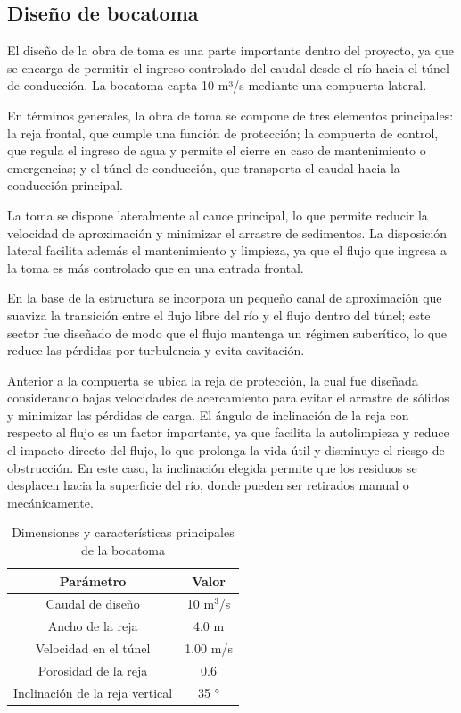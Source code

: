 \documentclass{article} %
\begin{document}
\subsection{Diseño de bocatoma}

El diseño de la obra de toma es una parte importante dentro del proyecto, ya que se encarga de permitir el ingreso controlado del caudal desde el río hacia el túnel de conducción. La bocatoma capta 10 m³/s mediante una compuerta lateral.

En términos generales, la obra de toma se compone de tres elementos principales: la reja frontal, que cumple una función de protección; la compuerta de control, que regula el ingreso de agua y permite el cierre en caso de mantenimiento o emergencias; y el túnel de conducción, que transporta el caudal hacia la conducción principal.

La toma se dispone lateralmente al cauce principal, lo que permite reducir la velocidad de aproximación y minimizar el arrastre de sedimentos. La disposición lateral facilita además el mantenimiento y limpieza, ya que el flujo que ingresa a la toma es más controlado que en una entrada frontal.

En la base de la estructura se incorpora un pequeño canal de aproximación que suaviza la transición entre el flujo libre del río y el flujo dentro del túnel; este sector fue diseñado de modo que el flujo mantenga un régimen subcrítico, lo que reduce las pérdidas por turbulencia y evita cavitación.

Anterior a la compuerta se ubica la reja de protección, la cual fue diseñada considerando bajas velocidades de acercamiento para evitar el arrastre de sólidos y minimizar las pérdidas de carga. El ángulo de inclinación de la reja con respecto al flujo es un factor importante, ya que facilita la autolimpieza y reduce el impacto directo del flujo, lo que prolonga la vida útil y disminuye el riesgo de obstrucción. En este caso, la inclinación elegida permite que los residuos se desplacen hacia la superficie del río, donde pueden ser retirados manual o mecánicamente. 


\begin{table}[h]
    \centering
    \begin{tabular}{c c}
        \textbf{Parámetro} & \textbf{Valor} \\
        \hline
        Caudal de diseño & 10 m$^3$/s \\ 
        Ancho de la reja & 4.0 m \\
        Velocidad en el túnel & 1.00 m/s \\
        Porosidad de la reja & 0.6 \\
        Inclinación de la reja vertical & 35 ° \\ \hline
    \end{tabular}
    \caption{Dimensiones y características principales de la bocatoma}
\end{table}
\end{document}
